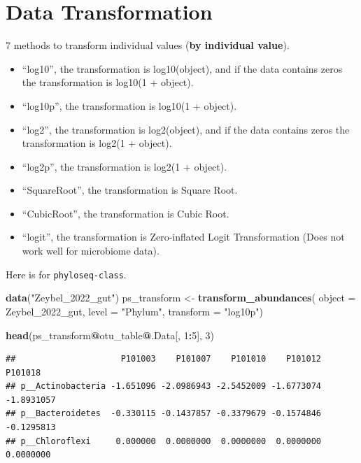 \documentclass[
]{book}
\newenvironment{Shaded}{\begin{snugshade}}{\end{snugshade}}
\newcommand{\AttributeTok}[1]{\textcolor[rgb]{0.13,0.29,0.53}{#1}}
\newcommand{\DecValTok}[1]{\textcolor[rgb]{0.00,0.00,0.81}{#1}}
\newcommand{\FunctionTok}[1]{\textcolor[rgb]{0.13,0.29,0.53}{\textbf{#1}}}
\newcommand{\NormalTok}[1]{#1}
\newcommand{\OtherTok}[1]{\textcolor[rgb]{0.56,0.35,0.01}{#1}}
\newcommand{\SpecialCharTok}[1]{\textcolor[rgb]{0.81,0.36,0.00}{\textbf{#1}}}
\newcommand{\StringTok}[1]{\textcolor[rgb]{0.31,0.60,0.02}{#1}}
\begin{document}
\hypertarget{data-transformation}{%
\section{Data Transformation}\label{data-transformation}}

7 methods to transform individual values (\textbf{by individual value}).

\begin{itemize}
\item
  ``log10'', the transformation is log10(object), and if the data contains zeros the transformation is log10(1 + object).
\item
  ``log10p'', the transformation is log10(1 + object).
\item
  ``log2'', the transformation is log2(object), and if the data contains zeros the transformation is log2(1 + object).
\item
  ``log2p'', the transformation is log2(1 + object).
\item
  ``SquareRoot'', the transformation is Square Root.
\item
  ``CubicRoot'', the transformation is Cubic Root.
\item
  ``logit'', the transformation is Zero-inflated Logit Transformation (Does not work well for microbiome data).
\end{itemize}

Here is for \texttt{phyloseq-class}.

\begin{Shaded}
\begin{Highlighting}[]
\FunctionTok{data}\NormalTok{(}\StringTok{"Zeybel\_2022\_gut"}\NormalTok{)}
\NormalTok{ps\_transform }\OtherTok{\textless{}{-}} \FunctionTok{transform\_abundances}\NormalTok{(}
  \AttributeTok{object =}\NormalTok{ Zeybel\_2022\_gut,}
  \AttributeTok{level =} \StringTok{"Phylum"}\NormalTok{,}
  \AttributeTok{transform =} \StringTok{"log10p"}\NormalTok{)}

\FunctionTok{head}\NormalTok{(ps\_transform}\SpecialCharTok{@}\NormalTok{otu\_table}\SpecialCharTok{@}\NormalTok{.Data[, }\DecValTok{1}\SpecialCharTok{:}\DecValTok{5}\NormalTok{], }\DecValTok{3}\NormalTok{)}
\end{Highlighting}
\end{Shaded}

\begin{verbatim}
##                     P101003    P101007    P101010    P101012    P101018
## p__Actinobacteria -1.651096 -2.0986943 -2.5452009 -1.6773074 -1.8931057
## p__Bacteroidetes  -0.330115 -0.1437857 -0.3379679 -0.1574846 -0.1295813
## p__Chloroflexi     0.000000  0.0000000  0.0000000  0.0000000  0.0000000
\end{verbatim}
\end{document}
